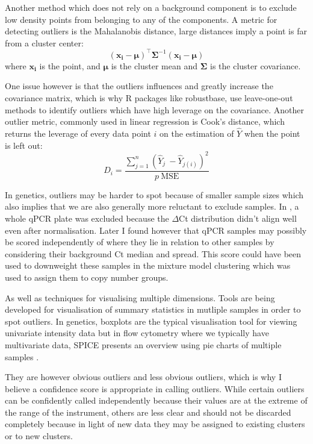 
Another method which does not rely on a background component is to exclude low density points from belonging to any of the components.
A metric for detecting outliers is the Mahalanobis distance, large distances imply a point is far from a cluster center:
\[
(\boldsymbol{x_i}-\boldsymbol{\mu})^{\top}\boldsymbol{\Sigma}^{-1}(\boldsymbol{x_i}-\boldsymbol{\mu})
\]
where $\boldsymbol{x_i}$ is the point, and $\boldsymbol{\mu}$ is the cluster mean and $\boldsymbol{\Sigma}$ is the cluster covariance.

One issue however is that the outliers influences and greatly increase the covariance matrix, which is why R packages like robustbase,
use leave-one-out methods to identify outliers which have high leverage on the covariance.
Another outlier metric, commonly used in linear regression is Cook's distance,
which returns the leverage of every data point $i$  on the estimation of $\hat Y$ when the point is left out:
\[
D_i = \frac{ \sum_{j=1}^n (\hat Y_j\ - \hat Y_{j(i)})^2 }{p \ \mathrm{MSE}}
\]

In genetics, outliers may be harder to spot because of smaller sample sizes which also implies that we are also generally more reluctant to exclude samples.
In , a whole qPCR plate was excluded because the $\Delta$Ct distribution didn’t align well even after normalisation.
Later I found however that qPCR samples may possibly be scored independently of where they lie in relation to other samples by considering their background Ct median and spread.
This score could have been used to downweight these samples in the mixture model clustering which was used to assign them to copy number groups.

As well as techniques for visualising multiple dimensions.
Tools are being developed for visualisation of summary statistics in mutliple samples in order to spot outliers.
In genetics, boxplots are the typical visualisation tool for viewing univariate intensity data but in flow cytometry where we typically have multivariate data,
SPICE presents an overview using pie charts of multiple samples \citep{Roederer:2011hy}.

They are however obvious outliers and less obvious outliers, which is why I believe a confidence score is appropriate in calling outliers.
While certain outliers can be confidently called independently because their values are at the extreme of the range of the instrument,
others are less clear and should not be discarded completely because in light of new data they may be assigned to existing clusters or
to new clusters.

